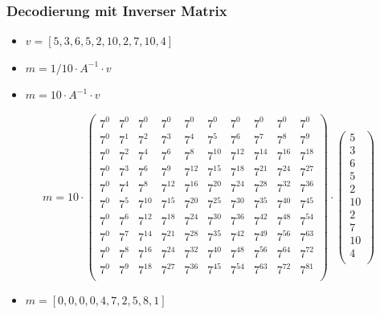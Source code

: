 \documentclass[11pt,aspectratio=169]{beamer}
\begin{document}
	\begin{frame}
		\frametitle{Decodierung mit Inverser Matrix}	
		
		\begin{itemize}
			\item $v = [5,3,6,5,2,10,2,7,10,4]$
			
			\item $m = 1/10 \cdot A^{-1} \cdot v$
			
			\item $m = 10 \cdot A^{-1} \cdot v$
			
		\end{itemize}

		\[
		m = 10 \cdot \begin{pmatrix}
			7^0&    7^0&    7^0&    7^0&    7^0&    7^0&    7^0&    7^0&    7^0&    7^0\\
			7^0&	7^1&	7^2&	7^3&	7^4&	7^5&	7^6&	7^7&    7^8&	7^9\\
			7^0&	7^2&	7^4&	7^6&	7^8& 7^{10}& 7^{12}& 7^{14}& 7^{16}& 7^{18}\\
			7^0&	7^3&	7^6&	7^9& 7^{12}& 7^{15}& 7^{18}& 7^{21}& 7^{24}& 7^{27}\\
			7^0&	7^4&	7^8& 7^{12}& 7^{16}& 7^{20}& 7^{24}& 7^{28}& 7^{32}& 7^{36}\\
			7^0&	7^5& 7^{10}& 7^{15}& 7^{20}& 7^{25}& 7^{30}& 7^{35}& 7^{40}& 7^{45}\\
			7^0&	7^6& 7^{12}& 7^{18}& 7^{24}& 7^{30}& 7^{36}& 7^{42}& 7^{48}& 7^{54}\\
			7^0&	7^7& 7^{14}& 7^{21}& 7^{28}& 7^{35}& 7^{42}& 7^{49}& 7^{56}& 7^{63}\\
			7^0&	7^8& 7^{16}& 7^{24}& 7^{32}& 7^{40}& 7^{48}& 7^{56}& 7^{64}& 7^{72}\\
			7^0&	7^9& 7^{18}& 7^{27}& 7^{36}& 7^{45}& 7^{54}& 7^{63}& 7^{72}& 7^{81}\\
		\end{pmatrix}
		\cdot
		\begin{pmatrix}
			5 \\ 3 \\ 6 \\ 5 \\ 2 \\ 10 \\ 2 \\ 7 \\ 10 \\ 4 \\
		\end{pmatrix}
		\]
		
		\begin{itemize}
			\item $m = [0,0,0,0,4,7,2,5,8,1]$
		\end{itemize}
		
	\end{frame}
\end{document}
